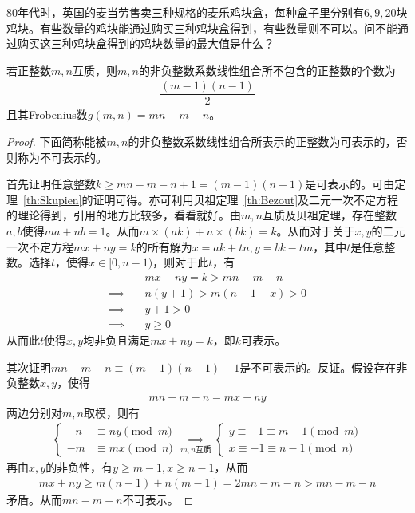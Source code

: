 \begin{example}
  $80$年代时，英国的麦当劳售卖三种规格的麦乐鸡块盒，每种盒子里分别有$6,9,20$块鸡块。有些数量的鸡块能通过购买三种鸡块盒得到，有些数量则不可以。问不能通过购买这三种鸡块盒得到的鸡块数量的最大值是什么？
\end{example}

\begin{theorem}
  若正整数$m,n$互质，则$m,n$的非负整数系数线性组合所不包含的正整数的个数为
  \begin{align*}
    \dfrac{(m-1)(n-1)}2
  \end{align*}
  且其Frobenius数$g(m,n)=mn-m-n$。
\end{theorem}
\begin{proof}下面简称能被$m,n$的非负整数系数线性组合所表示的正整数为可表示的，否则称为不可表示的。
  
  首先证明任意整数$k\ge mn-m-n+1=(m-1)(n-1)$是可表示的。可由定理~\ref{th:Skupien}的证明可得。亦可利用贝祖定理~\ref{th:Bezout}及二元一次不定方程的理论得到，引用的地方比较多，看看就好。由$m,n$互质及贝祖定理，存在整数$a,b$使得$ma+nb=1$。从而$m\times(ak)+n\times(bk)=k$。从而对于关于$x,y$的二元一次不定方程$mx+ny=k$的所有解为$x=ak+tn, y=bk-tm$，其中$t$是任意整数。选择$t$，使得$x\in[0,n-1)$，则对于此$t$，有
  \begin{align*}
    &mx + ny = k > mn -m -n \\
    \implies\quad& n(y+1)>m(n-1-x)>0\\
                                            \implies\quad&y+1>0\\
    \implies\quad& y\ge0    
  \end{align*}
  从而此$t$使得$x,y$均非负且满足$mx+ny=k$，即$k$可表示。


  其次证明$mn-m-n\equiv (m-1)(n-1)-1$是不可表示的。反证。假设存在非负整数$x,y$，使得
  \begin{align*}
    mn-m-n=mx+ny
  \end{align*}
  两边分别对$m,n$取模，则有
  \begin{align*}
    \begin{cases}
      -n&\equiv ny\pmod m\\
      -m&\equiv mx\pmod n
    \end{cases}
    \underset{m,n\text{互质}}{\implies}
    \begin{cases}
      y\equiv -1\equiv m-1 \pmod m\\
      x\equiv -1\equiv n-1 \pmod n
    \end{cases}
  \end{align*}
  再由$x,y$的非负性，有$y\ge m-1, x\ge n-1$，从而
  \begin{align*}
    mx + ny\ge m(n-1) + n(m-1) = 2mn -m -n > mn - m -n
  \end{align*}
  矛盾。从而$mn-m-n$不可表示。


\end{proof}
